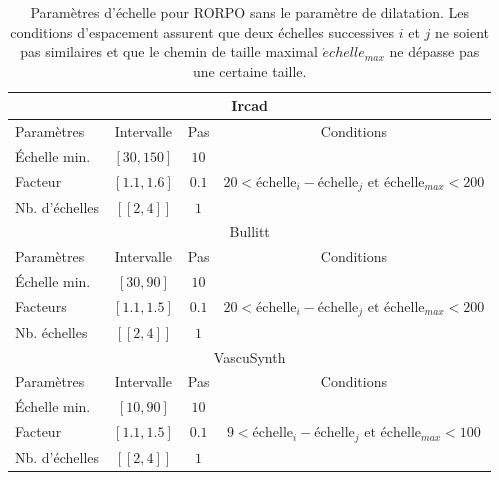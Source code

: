 \begin{table}[H]
  \caption{ Paramètres d'échelle pour RORPO sans le paramètre de dilatation. Les conditions d'espacement assurent que deux échelles successives $i$ et $j$  ne soient pas similaires et que le chemin de taille maximal $\acute{e}chelle_{max}$ ne dépasse pas une certaine taille.}
  \label{tab:SS_interval_RORPO}
  \begin{center}
    \begin{tabular}{  l  c  c  c }
      \hline
      \multicolumn{4}{c}{Ircad}\\
      \hline
      Paramètres & Intervalle & Pas & Conditions \\
      \hline
      Échelle min. & $[30,150]$ & $10$ & \\
      Facteur & $[1.1,1.6]$ & $0.1$ & $20 < \textrm{échelle}_{i} - \textrm{échelle}_{j} \textrm{~et~} \textrm{échelle}_{max} < 200 $ \\ 
      Nb. d'échelles & $[\![2,4]\!]$ & $1$ & \\
      \hline
      \hline
      \multicolumn{4}{c}{Bullitt}\\
      \hline
      Paramètres & Intervalle & Pas & Conditions \\
      \hline
      Échelle min. & $[30,90]$ & $10$ & \\
      
      Facteurs & $[1.1,1.5]$  & $0.1$ & $ 20 < \textrm{échelle}_{i} - \textrm{échelle}_{j} \textrm{~et~} \textrm{échelle}_{max} < 200$ \\
      Nb. échelles & $[\![2,4]\!]$ & $1$ & \\
      \hline
      \hline
      \multicolumn{4}{c}{VascuSynth}\\
      \hline
      Paramètres & Intervalle & Pas & Conditions \\
      \hline
      Échelle min. & $[10,90]$ & $10$ & \\
      
      Facteur & $[1.1,1.5]$  &  $0.1$ & $ 9 < \textrm{échelle}_{i} - \textrm{échelle}_{j} \textrm{~et~} \textrm{échelle}_{max} < 100$ \\
      
      Nb. d'échelles & $[\![2,4]\!]$ & $1$ & \\
      \hline
    \end{tabular}
  \end{center}
\end{table}

